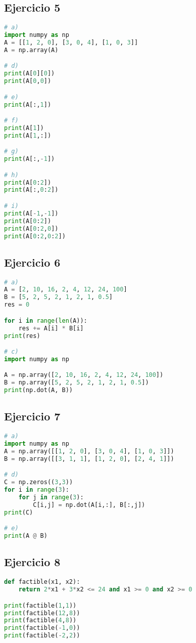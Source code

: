 \documentclass[12pt]{article}
\begin{document}
\subsection{Ejercicio 5}
\begin{lstlisting}[language=Python]
# a)
import numpy as np
A = [[1, 2, 0], [3, 0, 4], [1, 0, 3]]
A = np.array(A)

# d)
print(A[0][0])
print(A[0,0])

# e)
print(A[:,1])

# f)
print(A[1])
print(A[1,:])

# g)
print(A[:,-1])

# h)
print(A[0:2])
print(A[:,0:2])

# i)
print(A[-1,-1])
print(A[0:2])
print(A[0:2,0])
print(A[0:2,0:2])
\end{lstlisting}

\subsection{Ejercicio 6}
\begin{lstlisting}[language=Python]
# a)
A = [2, 10, 16, 2, 4, 12, 24, 100]
B = [5, 2, 5, 2, 1, 2, 1, 0.5]
res = 0

for i in range(len(A)):
    res += A[i] * B[i]
print(res)

# c)
import numpy as np

A = np.array([2, 10, 16, 2, 4, 12, 24, 100])
B = np.array([5, 2, 5, 2, 1, 2, 1, 0.5])
print(np.dot(A, B))
\end{lstlisting}

\subsection{Ejercicio 7}
\begin{lstlisting}[language=Python]
# a)
import numpy as np
A = np.array([[1, 2, 0], [3, 0, 4], [1, 0, 3]])
B = np.array([[3, 1, 1], [1, 2, 0], [2, 4, 1]])

# d)
C = np.zeros((3,3))
for i in range(3):
    for j in range(3):
        C[i,j] = np.dot(A[i,:], B[:,j])
print(C)

# e)
print(A @ B)
\end{lstlisting}

\subsection{Ejercicio 8}
\begin{lstlisting}[language=Python]
def factible(x1, x2):
    return 2*x1 + 3*x2 <= 24 and x1 >= 0 and x2 >= 0

print(factible(1,1))
print(factible(12,8))
print(factible(4,8))
print(factible(-1,0))
print(factible(-2,2))
\end{lstlisting}
\end{document}
